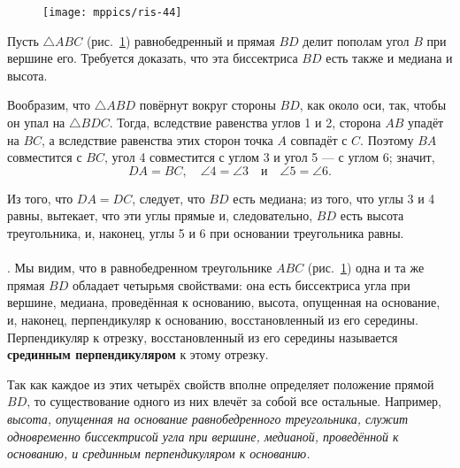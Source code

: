 \documentclass[oneside]{book}
\begin{document}
\begin{figure}
\centering
\texttt{[image: mppics/ris-44]}
\caption{}\label{1938/ris-44}
\end{figure}


Пусть $\triangle ABC$ (рис.~\ref{1938/ris-44}) равнобедренный и прямая $BD$ делит пополам угол $B$ при вершине его.
Требуется доказать, что эта биссектриса $BD$ есть также и медиана и высота.

Вообразим, что $\triangle ABD$ повёрнут вокруг стороны $BD$, как около оси, так, чтобы он упал на $\triangle BDC$.
Тогда, вследствие равенства углов 1 и 2, сторона $AB$ упадёт на $BC$, а вследствие равенства этих сторон точка $A$ совпадёт с $C$.
Поэтому $BA$ совместится с $BC$, угол 4 совместится с углом 3 и угол 5 — с углом 6;
значит,
\[DA = BC,\quad \angle 4 = \angle 3\quad \text{и}\quad \angle 5 = \angle 6.\]

Из того, что $DA=DC$, следует, что $BD$ есть медиана;
из того, что углы 3 и 4 равны, вытекает, что эти углы прямые и, следовательно, $BD$ есть высота треугольника, и, наконец, углы 5 и 6 при основании треугольника равны.

\paragraph{}\label{1938/39}
.
Мы видим, что в равнобедренном треугольнике $ABC$ (рис.~\ref{1938/ris-44}) одна и та же прямая $BD$ обладает четырьмя свойствами:
она есть биссектриса угла при вершине, медиана, проведённая к основанию, высота, опущенная на основание, и, наконец, перпендикуляр к основанию, восстановленный из его середины. 
Перпендикуляр к отрезку, восстановленный из его середины называется \textbf{срединным перпендикуляром} к этому отрезку.

Так как каждое из этих четырёх свойств вполне определяет положение прямой $BD$, то существование одного из них влечёт за собой все остальные.
Например, \emph{высота, опущенная на основание равнобедренного треугольника, служит одновременно биссектрисой угла при вершине, медианой, проведённой к основанию, и срединным перпендикуляром к основанию.} 
\end{document}
